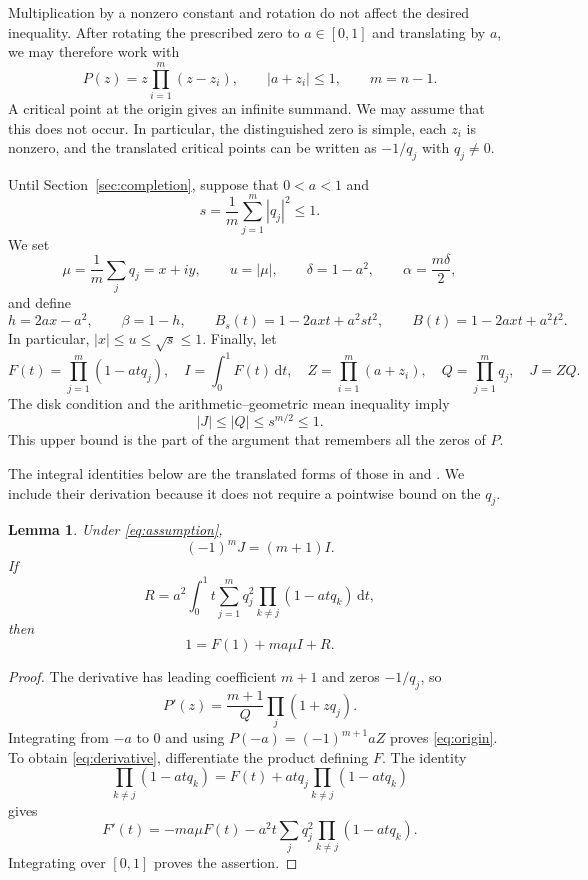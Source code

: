 \documentclass[11pt,letterpaper,reqno]{amsart}
\newtheorem{lem}[thm]{Lemma}
\theoremstyle{definition}
\numberwithin{equation}{section}
\newcommand{\dd}{\,\mathrm d}
\begin{document}
Multiplication by a nonzero constant and rotation do not affect the desired inequality. After rotating the prescribed zero to $a\in[0,1]$ and translating by $a$, we may therefore work with
\[
 P(z)=z\prod_{i=1}^m(z-z_i),\qquad |a+z_i|\le1,\qquad m=n-1.
\]
A critical point at the origin gives an infinite summand. We may assume that this does not occur. In particular, the distinguished zero is simple, each $z_i$ is nonzero, and the translated critical points can be written as $-1/q_j$ with $q_j\ne0$.

Until Section~\ref{sec:completion}, suppose that $0<a<1$ and
\begin{equation}\label{eq:assumption}
 s=\frac1m\sum_{j=1}^m|q_j|^2\le1.
\end{equation}
We set
\[
 \mu=\frac1m\sum_jq_j=x+iy,\qquad u=|\mu|,\qquad
 \delta=1-a^2,\qquad \alpha=\frac{m\delta}{2},
\]
and define
\[
 h=2ax-a^2,\qquad \beta=1-h,\qquad
 B_s(t)=1-2axt+a^2st^2,\qquad B(t)=1-2axt+a^2t^2.
\]
In particular, $|x|\le u\le\sqrt s\le1$. Finally, let
\[
 F(t)=\prod_{j=1}^m(1-atq_j),\quad I=\int_0^1F(t)\dd t,\quad
 Z=\prod_{i=1}^m(a+z_i),\quad Q=\prod_{j=1}^m q_j,\quad J=ZQ.
\]
The disk condition and the arithmetic--geometric mean inequality imply
\begin{equation}\label{eq:Jupper}
 |J|\le |Q|\le s^{m/2}\le1.
\end{equation}
This upper bound is the part of the argument that remembers all the zeros of $P$.

The integral identities below are the translated forms of those in \cite[Section~3, pp.~3--4]{Maz26} and \cite[Lemma~6, (8)--(10)]{Tao26}. We include their derivation because it does not require a pointwise bound on the $q_j$.

\begin{lem}\label{lem:origin}
Under \eqref{eq:assumption},
\begin{equation}\label{eq:origin}
 (-1)^mJ=(m+1)I.
\end{equation}
If
\[
 R=a^2\int_0^1t\sum_{j=1}^m q_j^2
             \prod_{k\ne j}(1-atq_k)\dd t,
\]
then
\begin{equation}\label{eq:derivative}
 1=F(1)+ma\mu I+R.
\end{equation}
\end{lem}

\begin{proof}
The derivative has leading coefficient $m+1$ and zeros $-1/q_j$, so
\[
 P'(z)=\frac{m+1}{Q}\prod_j(1+zq_j).
\]
Integrating from $-a$ to $0$ and using $P(-a)=(-1)^{m+1}aZ$ proves \eqref{eq:origin}. To obtain \eqref{eq:derivative}, differentiate the product defining $F$. The identity
\[
 \prod_{k\ne j}(1-atq_k)=F(t)+atq_j\prod_{k\ne j}(1-atq_k)
\]
gives
\[
 F'(t)=-ma\mu F(t)-a^2t\sum_jq_j^2\prod_{k\ne j}(1-atq_k).
\]
Integrating over $[0,1]$ proves the assertion.
\end{proof}
\end{document}
